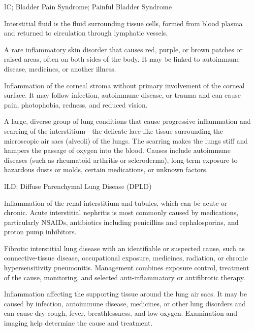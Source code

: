 \synonyms
IC; Bladder Pain Syndrome; Painful Bladder Syndrome

 Interstitial fluid is the fluid surrounding tissue cells, formed from blood plasma and returned to circulation through lymphatic vessels.

 A rare inflammatory skin disorder that causes red, purple, or brown patches or raised areas, often on both sides of the body. It may be linked to autoimmune disease, medicines, or another illness.

 Inflammation of the corneal stroma without primary involvement of the corneal surface.
It may follow infection, autoimmune disease, or trauma and can cause pain, photophobia,
redness, and reduced vision.

 A large, diverse group of lung conditions that cause progressive inflammation and scarring of the interstitium---the delicate lace-like tissue surrounding the microscopic air sacs (alveoli) of the lungs. The scarring makes the lungs stiff and hampers the passage of oxygen into the blood. Causes include autoimmune diseases (such as rheumatoid arthritis or scleroderma), long-term exposure to hazardous dusts or molds, certain medications, or unknown factors.

\synonyms
ILD; Diffuse Parenchymal Lung Disease (DPLD)

 Inflammation of the renal interstitium and tubules, which can be acute or chronic. Acute
interstitial nephritis is most commonly caused by medications, particularly NSAIDs,
antibiotics including penicillins and cephalosporins, and proton pump inhibitors.

 Fibrotic interstitial lung disease with an identifiable or suspected cause, such as connective-tissue disease, occupational exposure, medicines, radiation, or chronic hypersensitivity pneumonitis. Management combines exposure control, treatment of the cause, monitoring, and selected anti-inflammatory or antifibrotic therapy.

 Inflammation affecting the supporting tissue around the lung air sacs. It may be caused by infection, autoimmune disease, medicines, or other lung disorders and can cause dry cough, fever, breathlessness, and low oxygen. Examination and imaging help determine the cause and treatment.

